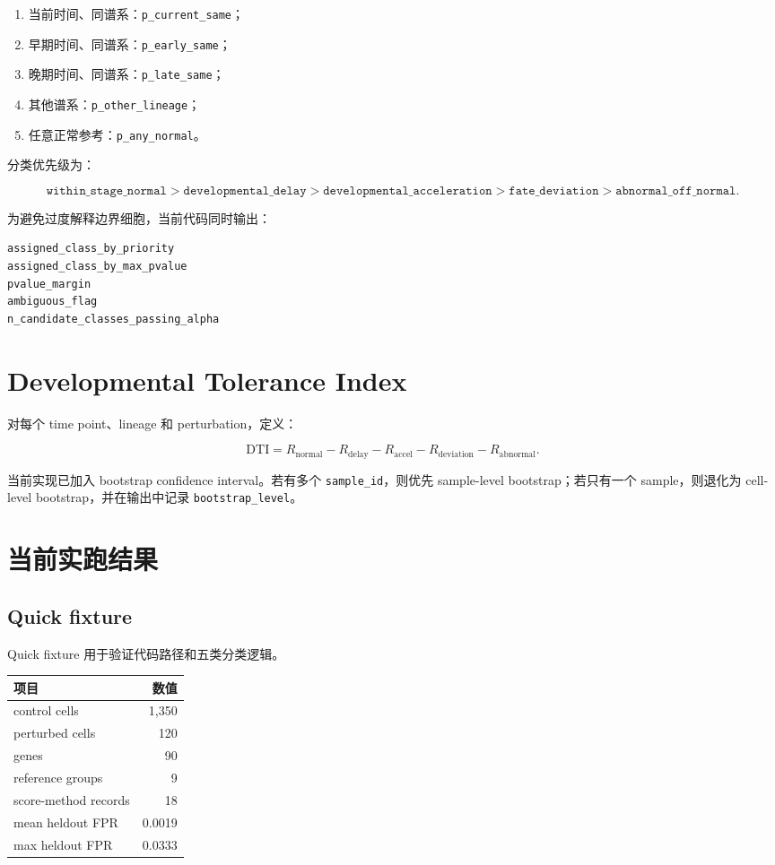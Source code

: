 \documentclass[11pt]{article}
\begin{document}
\begin{enumerate}
  \item 当前时间、同谱系：\texttt{p\_current\_same}；
  \item 早期时间、同谱系：\texttt{p\_early\_same}；
  \item 晚期时间、同谱系：\texttt{p\_late\_same}；
  \item 其他谱系：\texttt{p\_other\_lineage}；
  \item 任意正常参考：\texttt{p\_any\_normal}。
\end{enumerate}

分类优先级为：

\[
\texttt{within\_stage\_normal}
>
\texttt{developmental\_delay}
>
\texttt{developmental\_acceleration}
>
\texttt{fate\_deviation}
>
\texttt{abnormal\_off\_normal}.
\]

为避免过度解释边界细胞，当前代码同时输出：

\begin{verbatim}
assigned_class_by_priority
assigned_class_by_max_pvalue
pvalue_margin
ambiguous_flag
n_candidate_classes_passing_alpha
\end{verbatim}

\section*{Developmental Tolerance Index}

对每个 time point、lineage 和 perturbation，定义：

\[
\mathrm{DTI}
=R_{\mathrm{normal}}
-R_{\mathrm{delay}}
-R_{\mathrm{accel}}
-R_{\mathrm{deviation}}
-R_{\mathrm{abnormal}}.
\]

当前实现已加入 bootstrap confidence interval。若有多个 \texttt{sample\_id}，则优先 sample-level bootstrap；若只有一个 sample，则退化为 cell-level bootstrap，并在输出中记录 \texttt{bootstrap\_level}。

\section*{当前实跑结果}

\subsection*{Quick fixture}

Quick fixture 用于验证代码路径和五类分类逻辑。

\begin{center}
\begin{tabular}{lr}
\toprule
项目 & 数值 \\
\midrule
control cells & 1,350 \\
perturbed cells & 120 \\
genes & 90 \\
reference groups & 9 \\
score-method records & 18 \\
mean heldout FPR & 0.0019 \\
max heldout FPR & 0.0333 \\
\bottomrule
\end{tabular}
\end{center}
\end{document}
